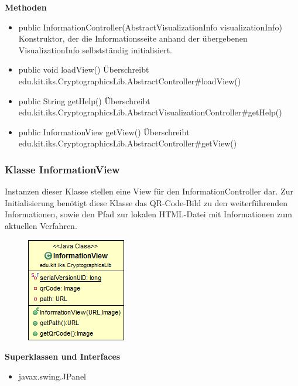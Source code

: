 \documentclass{article}
\begin{document}
      \textbf{Methoden}
      \begin{itemize}
        \item public InformationController(AbstractVisualizationInfo visualizationInfo) \newline
          Konstruktor, der die Informationsseite anhand der übergebenen VisualizationInfo
          selbstständig initialisiert.
		\item public void loadView() \newline
		  Überschreibt edu.kit.iks.CryptographicsLib.AbstractController\#loadView()
		\item public String getHelp() \newline
		  Überschreibt edu.kit.iks.CryptographicsLib.AbstractVisualizationController\#getHelp()
		\item public InformationView getView() \newline
		  Überschreibt edu.kit.iks.CryptographicsLib.AbstractController\#getView()
      \end{itemize}
	
	\subsubsection{Klasse InformationView}
	  Instanzen dieser Klasse stellen eine View für den InformationController dar.
	  Zur Initialisierung benötigt diese Klasse das QR-Code-Bild zu den weiterführenden 
	  Informationen, sowie den Pfad zur lokalen HTML-Datei mit Informationen zum
	  aktuellen Verfahren.
	
      \begin{figure}[H]
        \centering
        \includegraphics{resources/edu-kit-iks-CryptographicsLib-InformationView}
      \end{figure}
	
      \textbf{Superklassen und Interfaces}
      \begin{itemize}
        \item javax.swing.JPanel
      \end{itemize}
	
\end{document}
